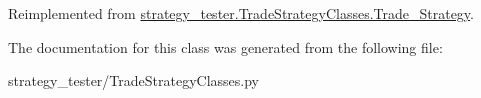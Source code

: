 \-Reimplemented from \hyperlink{classstrategy__tester_1_1TradeStrategyClasses_1_1Trade__Strategy_a8c9f0fb20285f4a900e6cfcea2896b69}{strategy\-\_\-tester.\-Trade\-Strategy\-Classes.\-Trade\-\_\-\-Strategy}.



\-The documentation for this class was generated from the following file\-:\begin{DoxyCompactItemize}
\item 
strategy\-\_\-tester/\-Trade\-Strategy\-Classes.\-py\end{DoxyCompactItemize}
